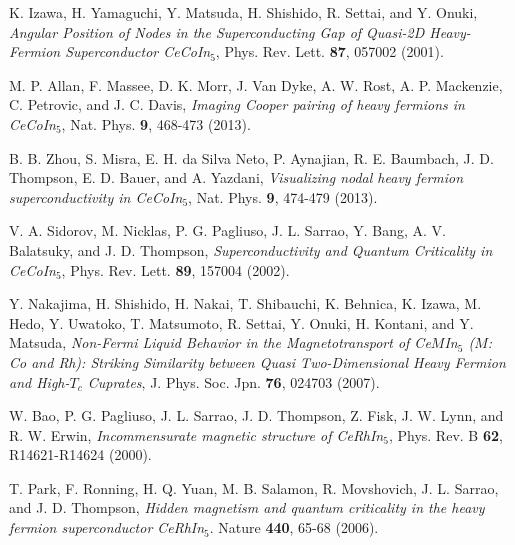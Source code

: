 \documentclass[twocolumn,preprintnumbers,amsmath,amssymb,prl]{revtex4}
\begin{document}
\begin{thebibliography}{99}
		K. Izawa, H. Yamaguchi, Y. Matsuda, H. Shishido, R. Settai, and Y. Onuki, 
		{\it Angular Position of Nodes in the Superconducting Gap of Quasi-2D Heavy-Fermion Superconductor CeCoIn$_5$}, 
		Phys. Rev. Lett. {\bf 87}, 057002 (2001). 
		
		M. P. Allan, F. Massee, D. K. Morr, J. Van Dyke, A. W. Rost, A. P. Mackenzie, C. Petrovic, and J. C. Davis, 
		{\it Imaging Cooper pairing of heavy fermions in CeCoIn$_5$}, 
		Nat. Phys. {\bf 9}, 468-473 (2013). 
		
		B. B. Zhou, S. Misra, E. H. da Silva Neto, P. Aynajian, R. E. Baumbach, J. D. Thompson, E. D. Bauer, and A. Yazdani, 
		{\it Visualizing nodal heavy fermion superconductivity in CeCoIn$_5$}, 
		Nat. Phys. {\bf 9}, 474-479 (2013). 	
	
	
		V. A. Sidorov, M. Nicklas, P. G. Pagliuso, J. L. Sarrao, Y. Bang, A. V. Balatsuky, and J. D. Thompson, 
		{\it Superconductivity and Quantum Criticality in CeCoIn$_5$}, 
		Phys. Rev. Lett. {\bf 89}, 157004 (2002). 
		
		Y. Nakajima, H. Shishido, H. Nakai, T. Shibauchi, K. Behnica, K. Izawa, M. Hedo, Y. Uwatoko, T. Matsumoto, R. Settai, Y. Onuki, H. Kontani, and Y. Matsuda, 
		{\it Non-Fermi Liquid Behavior in the Magnetotransport of Ce$M$In$_5$ ($M$: Co and Rh): Striking Similarity between Quasi Two-Dimensional Heavy Fermion and High-$T_c$ Cuprates}, 
		J. Phys. Soc. Jpn. {\bf 76}, 024703 (2007). 
	

		
		W. Bao, P. G. Pagliuso, J. L. Sarrao, J. D. Thompson, Z. Fisk, J. W. Lynn, and R. W. Erwin, 
		{\it Incommensurate magnetic structure of CeRhIn$_5$}, 
		Phys. Rev. B {\bf 62}, R14621-R14624 (2000). 

		T. Park, F. Ronning, H. Q. Yuan, M. B. Salamon, R. Movshovich, J. L. Sarrao, and J. D. Thompson, 
		{\it Hidden magnetism and quantum criticality in the heavy fermion superconductor CeRhIn$_5$}. 
		Nature {\bf 440}, 65-68 (2006). 


\end{thebibliography}
\end{document}
